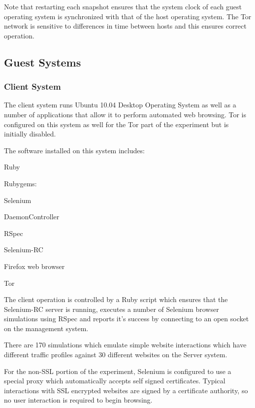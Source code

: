 Note that restarting each snapshot ensures that the system clock of each guest operating system is synchronized with that of the host operating system. The Tor network is sensitive to differences in time between hosts and this ensures correct operation.

\subsection{Guest Systems}

\subsubsection{Client System}

The client system runs Ubuntu 10.04 Desktop Operating System as well as a number of applications that allow it to perform automated web browsing. Tor is configured on this system as well for the Tor part of the experiment but is initially disabled.

The software installed on this system includes:

\begin{itemize*}
  \item Ruby
  \item Rubygems:
    \begin{itemize*}
      \item Selenium
      \item DaemonController
      \item RSpec
    \end{itemize*}
  \item Selenium-RC
  \item Firefox web browser
  \item Tor
\end{itemize*}

The client operation is controlled by a Ruby script which ensures that the Selenium-RC server is running, executes a number of Selenium browser simulations using RSpec and reports it's success by connecting to an open socket on the management system.

There are 170 simulations which emulate simple website interactions which have different traffic profiles against 30 different websites on the Server system.

For the non-SSL portion of the experiment, Selenium is configured to use a special proxy which automatically accepts self signed certificates. Typical interactions with SSL encrypted websites are signed by a certificate authority, so no user interaction is required to begin browsing.

